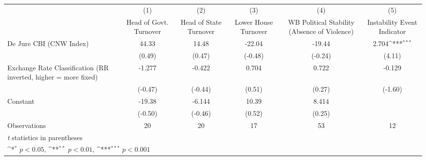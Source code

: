 {
\def\sym#1{\ifmmode^{#1}\else\(^{#1}\)\fi}
\begin{tabular*}{\linewidth}{@{\hskip\tabcolsep\extracolsep\fill}l*{5}{c}}
\hline\hline
                &\multicolumn{1}{c}{(1)}&\multicolumn{1}{c}{(2)}&\multicolumn{1}{c}{(3)}&\multicolumn{1}{c}{(4)}&\multicolumn{1}{c}{(5)}\\
                &\multicolumn{1}{c}{Head of Govt. Turnover}&\multicolumn{1}{c}{Head of State Turnover}&\multicolumn{1}{c}{Lower House Turnover}&\multicolumn{1}{c}{WB Political Stability (Absence of Violence)}&\multicolumn{1}{c}{Instability Event Indicator}\\
\hline
De Jure CBI (CNW Index)&    44.33         &    14.48         &   -22.04         &   -19.44         &    2.704\sym{***}\\
                &   (0.49)         &   (0.47)         &  (-0.48)         &  (-0.24)         &   (4.11)         \\
[1em]
Exchange Rate Classification (RR inverted, higher = more fixed)&   -1.277         &   -0.422         &    0.704         &    0.722         &   -0.129         \\
                &  (-0.47)         &  (-0.44)         &   (0.51)         &   (0.27)         &  (-1.60)         \\
[1em]
Constant        &   -19.38         &   -6.144         &    10.39         &    8.414         &                  \\
                &  (-0.50)         &  (-0.46)         &   (0.52)         &   (0.25)         &                  \\
\hline
Observations    &       20         &       20         &       17         &       53         &       12         \\
\hline\hline
\multicolumn{6}{l}{\footnotesize \textit{t} statistics in parentheses}\\
\multicolumn{6}{l}{\footnotesize \sym{*} \(p<0.05\), \sym{**} \(p<0.01\), \sym{***} \(p<0.001\)}\\
\end{tabular*}
}
